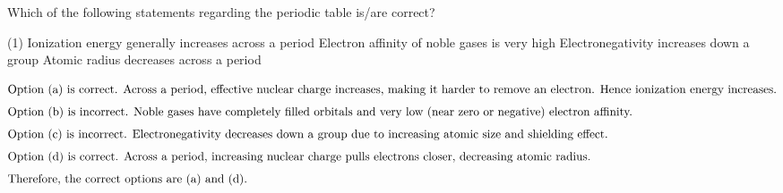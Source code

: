 
\item Which of the following statements regarding the periodic table is/are correct?

\begin{tasks}(1)
    \task Ionization energy generally increases across a period \ans
    \task Electron affinity of noble gases is very high
    \task Electronegativity increases down a group
    \task Atomic radius decreases across a period \ans
\end{tasks}

\begin{solution}
\begin{align*}
\intertext{Option (a) is correct. Across a period, effective nuclear charge increases, making it harder to remove an electron. Hence ionization energy increases.}
\intertext{Option (b) is incorrect. Noble gases have completely filled orbitals and very low (near zero or negative) electron affinity.}
\intertext{Option (c) is incorrect. Electronegativity decreases down a group due to increasing atomic size and shielding effect.}
\intertext{Option (d) is correct. Across a period, increasing nuclear charge pulls electrons closer, decreasing atomic radius.}
\intertext{Therefore, the correct options are (a) and (d).}
\end{align*}
\end{solution}
